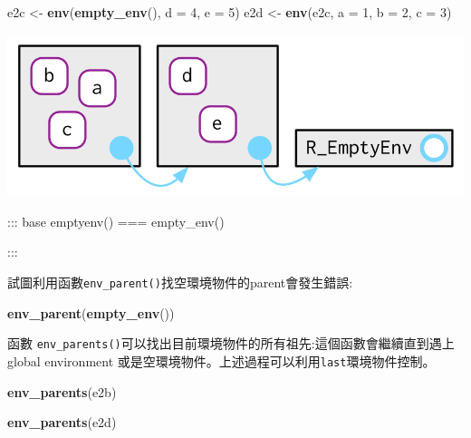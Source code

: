\documentclass[]{book}
\newenvironment{Shaded}{\begin{snugshade}}{\end{snugshade}}
\newcommand{\KeywordTok}[1]{\textcolor[rgb]{0.13,0.29,0.53}{\textbf{#1}}}
\newcommand{\DataTypeTok}[1]{\textcolor[rgb]{0.13,0.29,0.53}{#1}}
\newcommand{\DecValTok}[1]{\textcolor[rgb]{0.00,0.00,0.81}{#1}}
\newcommand{\StringTok}[1]{\textcolor[rgb]{0.31,0.60,0.02}{#1}}
\newcommand{\NormalTok}[1]{#1}
\theoremstyle{definition}
\theoremstyle{definition}
\theoremstyle{definition}
\theoremstyle{remark}
\begin{document}
\begin{Shaded}
\begin{Highlighting}[]
\NormalTok{e2c <-}\StringTok{ }\KeywordTok{env}\NormalTok{(}\KeywordTok{empty_env}\NormalTok{(), }\DataTypeTok{d =} \DecValTok{4}\NormalTok{, }\DataTypeTok{e =} \DecValTok{5}\NormalTok{)}
\NormalTok{e2d <-}\StringTok{ }\KeywordTok{env}\NormalTok{(e2c, }\DataTypeTok{a =} \DecValTok{1}\NormalTok{, }\DataTypeTok{b =} \DecValTok{2}\NormalTok{, }\DataTypeTok{c =} \DecValTok{3}\NormalTok{)}
\end{Highlighting}
\end{Shaded}

\begin{center}\includegraphics{diagrams/environments/parents-empty} \end{center}

::: base emptyenv() === empty\_env()

:::

試圖利用函數\texttt{env\_parent()}找空環境物件的parent會發生錯誤:

\begin{Shaded}
\begin{Highlighting}[]
\KeywordTok{env_parent}\NormalTok{(}\KeywordTok{empty_env}\NormalTok{())}
\end{Highlighting}
\end{Shaded}

函數
\texttt{env\_parents()}可以找出目前環境物件的所有祖先:這個函數會繼續直到遇上global
environment 或是空環境物件。上述過程可以利用\texttt{last}環境物件控制。

\begin{Shaded}
\begin{Highlighting}[]
\KeywordTok{env_parents}\NormalTok{(e2b)}
\end{Highlighting}
\end{Shaded}

\begin{Shaded}
\begin{Highlighting}[]
\KeywordTok{env_parents}\NormalTok{(e2d)}
\end{Highlighting}
\end{Shaded}
\end{document}
